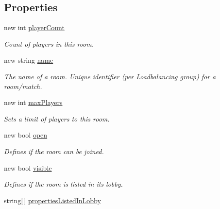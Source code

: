 \subsection*{Properties}
\begin{DoxyCompactItemize}
\item 
new int \hyperlink{class_room_aa9d85e54b2ff1b151de3670e87549966}{player\+Count}
\begin{DoxyCompactList}\small\item\em Count of players in this room.\end{DoxyCompactList}\item 
new string \hyperlink{class_room_ad9eb0946b646b789772238b429d6266c}{name}
\begin{DoxyCompactList}\small\item\em The name of a room. Unique identifier (per Loadbalancing group) for a room/match.\end{DoxyCompactList}\item 
new int \hyperlink{class_room_a3d3329a383d9cc0e4dcf10527ed42845}{max\+Players}
\begin{DoxyCompactList}\small\item\em Sets a limit of players to this room. \end{DoxyCompactList}\item 
new bool \hyperlink{class_room_a86a1e0952d484cc7a679e141463f43c1}{open}
\begin{DoxyCompactList}\small\item\em Defines if the room can be joined. \end{DoxyCompactList}\item 
new bool \hyperlink{class_room_a8792cdddd5a4b8933bea7adab8438edf}{visible}
\begin{DoxyCompactList}\small\item\em Defines if the room is listed in its lobby. \end{DoxyCompactList}\item 
string\mbox{[}$\,$\mbox{]} \hyperlink{class_room_a9f4957e84aefcd801a35a63f44ce42f3}{properties\+Listed\+In\+Lobby}

\end{DoxyCompactItemize}
